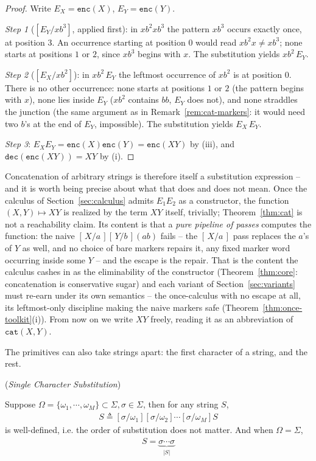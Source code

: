 \documentclass[runningheads,envcountsect]{llncs}
\begin{document}
\begin{proof}
    Write $E_X = \mathtt{enc}(X)$, $E_Y = \mathtt{enc}(Y)$.

    \emph{Step 1} ($[E_Y/xb^3]$, applied first): in $xb^2xb^3$ the pattern $xb^3$ occurs exactly once, at position $3$. An occurrence starting at position $0$ would read $xb^2x \neq xb^3$; none starts at positions $1$ or $2$, since $xb^3$ begins with $x$. The substitution yields $xb^2\,E_Y$.

    \emph{Step 2} ($[E_X/xb^2]$): in $xb^2\,E_Y$ the leftmost occurrence of $xb^2$ is at position $0$. There is no other occurrence: none starts at positions $1$ or $2$ (the pattern begins with $x$), none lies inside $E_Y$ ($xb^2$ contains $bb$, $E_Y$ does not), and none straddles the junction (the same argument as in Remark~\ref{rem:cat-markers}: it would need two $b$'s at the end of $E_Y$, impossible). The substitution yields $E_X\,E_Y$.

    \emph{Step 3}: $E_XE_Y = \mathtt{enc}(X)\mathtt{enc}(Y) = \mathtt{enc}(XY)$ by (iii), and $\mathtt{dec}(\mathtt{enc}(XY)) = XY$ by (i).
\end{proof}

Concatenation of arbitrary strings is therefore itself a substitution
expression -- and it is worth being precise about what that does and
does not mean.  Once the calculus of Section~\ref{sec:calculus} admits
$E_1E_2$ as a constructor, the function $(X, Y) \mapsto XY$ is
realized by the term $XY$ itself, trivially; Theorem~\ref{thm:cat} is
not a reachability claim.  Its content is that a \emph{pure pipeline
of passes} computes the function: the naive $[\,X/a\,][\,Y/b\,](ab)$
fails -- the $[\,X/a\,]$ pass replaces the $a$'s of $Y$ as well, and
no choice of bare markers repairs it, any fixed marker word occurring
inside some $Y$ -- and the escape is the repair.  That is the content
the calculus cashes in as the eliminability of the constructor
(Theorem~\ref{thm:core}: concatenation is conservative sugar) and each
variant of Section~\ref{sec:variants} must re-earn under its own
semantics -- the once-calculus with no escape at all, its
leftmost-only discipline making the naive markers safe
(Theorem~\ref{thm:once-toolkit}(i)).  From now on we write $XY$
freely, reading it as an abbreviation of $\mathtt{cat}(X,Y)$.

The primitives can also take strings apart: the first character of a string, and the rest.

\begin{lemma}
    (\emph{Single Character Substitution})

    Suppose $\Omega  = \{\omega_1,\cdots,\omega_M\}\subset \Sigma,\sigma \in \Sigma$, then for any string $S$,
    \begin{align}
        [\sigma/\Omega]S \triangleq [\sigma/\omega_1][\sigma/\omega_2]\cdots[\sigma/\omega_M]S
    \end{align}
    is well-defined, i.e. the order of substitution does not matter. And when $\Omega=\Sigma$,
    \begin{align}
        [\sigma/\Sigma]S = \underbrace{\sigma\cdots\sigma}_{|S|}
    \end{align}
    \label{lem:single character substitution}
\end{lemma}
\end{document}
